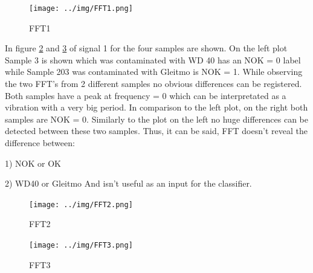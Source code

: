 \documentclass[12pt]{report}
\begin{document}
\begin{figure}[H]
	\texttt{[image: ../img/FFT1.png]}
	\caption{FFT1}
	\label{fig:FFT1}
\end{figure}

In figure \ref{fig:FFT2} and \ref{fig:FFT3} of signal 1 for the four samples are shown. On the left plot Sample 3 is shown which was contaminated with WD 40 has an NOK = 0 label while Sample 203 was contaminated with Gleitmo is NOK = 1. While observing the two FFT’s from 2 different samples no obvious differences can be registered. Both samples have a peak at frequency = 0 which can be interpretated as a vibration with a very big period. In comparison to the left plot, on the right both samples are NOK = 0. Similarly to the plot on the left no huge differences can be detected between these two samples. Thus, it can be said, FFT doesn’t reveal the difference between:


1)	NOK or OK


2)	WD40 or Gleitmo\newline
And isn’t useful as an input for the classifier.

\begin{figure}[H]
	\texttt{[image: ../img/FFT2.png]}
	\caption{FFT2}
	\label{fig:FFT2}
\end{figure}
\begin{figure}[H]
	\texttt{[image: ../img/FFT3.png]}
	\caption{FFT3}
	\label{fig:FFT3}
\end{figure}
\end{document}
